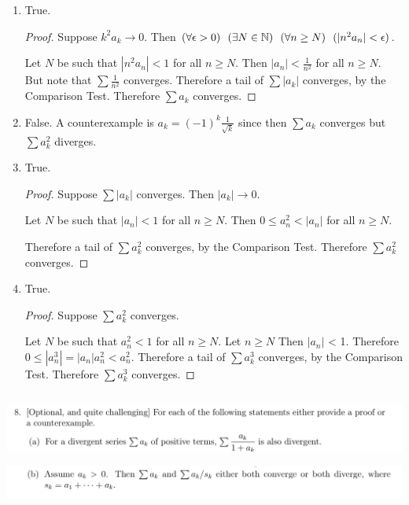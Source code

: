 \documentclass[12pt]{article}
\begin{document}
\begin{enumerate}[label=(\alph*)]
\item True.
  \begin{proof} Suppose $k^2a_k \to 0$. Then
    $(\forall \epsilon > 0) ~~ (\exists N \in \mathbb{N}) ~~ (\forall n \geq N) ~~ (|n^2a_n| < \epsilon)$.

    Let $N$ be such that $|n^2a_n| < 1$ for all $n \geq N$. Then $|a_n| < \frac{1}{n^2}$ for all
    $n \geq N$. But note that $\sum \frac{1}{n^2}$ converges. Therefore a tail of $\sum |a_k|$
    converges, by the Comparison Test. Therefore $\sum a_k$ converges.
  \end{proof}
\item False. A counterexample is $a_k = (-1)^k\frac{1}{\sqrt{k}}$ since then $\sum a_k$ converges
  but $\sum a_k^2$ diverges.
\item True.
  \begin{proof}
    Suppose $\sum |a_k|$ converges. Then $|a_k| \to 0$.

    Let $N$ be such that $|a_n| < 1$ for all $n \geq N$. Then $0 \leq a_n^2 < |a_n|$ for all
    $n \geq N$.

    Therefore a tail of $\sum a_k^2$ converges, by the Comparison Test. Therefore $\sum a_k^2$
    converges.
  \end{proof}
\item True.
  \begin{proof}
    Suppose $\sum a_k^2$ converges.

    Let $N$ be such that $a_n^2 < 1$ for all $n \geq N$. Let $n \geq N$ Then $|a_n|$ < 1. Therefore
    $0 \leq |a_n^3| = |a_n|a_n^2 < a_n^2$. Therefore a tail of $\sum a_k^3$ converges, by the
    Comparison Test. Therefore $\sum a_k^3$ converges.
  \end{proof}
\end{enumerate}

\newpage
\subsection{}
\begin{mdframed}
\includegraphics[width=400pt]{img/analysis--oxford-M2-I-5-8-a.png}
\end{mdframed}

\begin{mdframed}
\includegraphics[width=400pt]{img/analysis--oxford-M2-I-5-8-b.png}
\end{mdframed}
\end{document}
